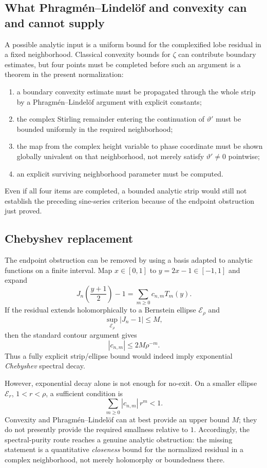 \documentclass[11pt]{article}
\theoremstyle{definition}
\begin{document}
\subsection{What Phragm\'en--Lindel\"of and convexity can and cannot supply}

A possible analytic input is a uniform bound for the complexified lobe
residual in a fixed neighborhood.  Classical convexity bounds for $\zeta$
can contribute boundary estimates, but four points must be completed before
such an argument is a theorem in the present normalization:

\begin{enumerate}[leftmargin=1.8em]
\item a boundary convexity estimate must be propagated through the whole
strip by a Phragm\'en--Lindel\"of argument with explicit constants;
\item the complex Stirling remainder entering the continuation of
$\vartheta'$ must be bounded uniformly in the required neighborhood;
\item the map from the complex height variable to phase coordinate must be
shown globally univalent on that neighborhood, not merely satisfy
$\vartheta'\neq0$ pointwise;
\item an explicit surviving neighborhood parameter must be computed.
\end{enumerate}

Even if all four items are completed, a bounded analytic strip would still
not establish the preceding sine-series criterion because of the endpoint
obstruction just proved.

\subsection{Chebyshev replacement}

The endpoint obstruction can be removed by using a basis adapted to analytic
functions on a finite interval.  Map $x\in[0,1]$ to $y=2x-1\in[-1,1]$ and
expand
\[
J_n\!\left(\frac{y+1}{2}\right)-1
=
\sum_{m\ge0} c_{n,m}T_m(y).
\]
If the residual extends holomorphically to a Bernstein ellipse
$\mathcal E_\rho$ and
\[
\sup_{\mathcal E_\rho}|J_n-1|\le M,
\]
then the standard contour argument gives
\[
\boxed{
|c_{n,m}|\le 2M\rho^{-m}.
}
\]
Thus a fully explicit strip/ellipse bound would indeed imply exponential
\emph{Chebyshev} spectral decay.

However, exponential decay alone is not enough for no-exit.  On a smaller
ellipse $\mathcal E_r$, $1<r<\rho$, a sufficient condition is
\[
\boxed{
\sum_{m\ge0}|c_{n,m}|\,r^m<1.
}
\]
Convexity and Phragm\'en--Lindel\"of can at best provide an upper bound $M$;
they do not presently provide the required smallness relative to $1$.
Accordingly, the spectral-purity route reaches a genuine analytic
obstruction: the missing statement is a quantitative \emph{closeness} bound
for the normalized residual in a complex neighborhood, not merely
holomorphy or boundedness there.
\end{document}

